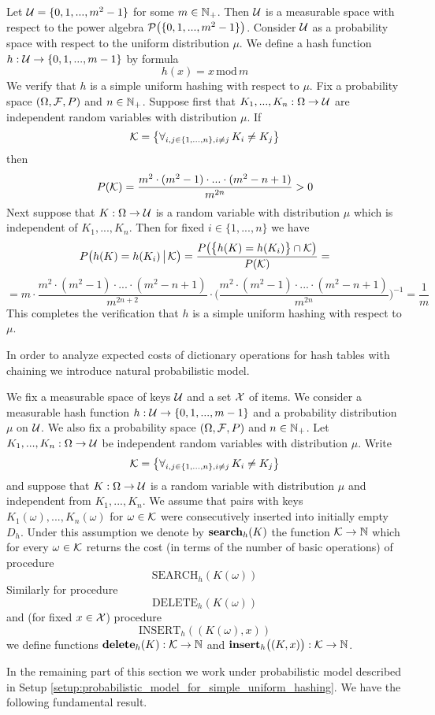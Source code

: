 \begin{example}\label{example:interval_of_integers_with_modulo_hash_function_as_an_example_of_suh}
Let ${\mathcal U} = \{0,1,...,m^2-1\}$ for some $m\in {\mathbb N}_+$. Then ${\mathcal U}$ is a measurable space with respect to the power algebra ${\mathcal P}\big(\{0,1,...,m^2-1\}\big)$. Consider ${\mathcal U}$ as a probability space with respect to the uniform distribution $\mu$. We define a hash function $h:{\mathcal U} \rightarrow \{0,1,...,m-1\}$ by formula
$$h(x) = x\,\mathrm{mod}\,m$$
We verify that $h$ is a simple uniform hashing with respect to $\mu$. Fix a probability space $(\Omega,{\mathcal F},P)$ and $n\in {\mathbb N}_+$. Suppose first that $K_1,...,K_n:\Omega\rightarrow {\mathcal U}$ are independent random variables with distribution $\mu$. If 
$${\mathcal K} =\big\{\forall_{i,j\in \{1,...,n\},i\neq j}\,K_i\neq K_j\big\}$$
then
$$P({\mathcal K}) = \frac{m^2 \cdot (m^2 - 1) \cdot ... \cdot (m^2 - n + 1)}{m^{2n}} > 0$$
Next suppose that $K:\Omega\rightarrow {\mathcal U}$ is a random variable with distribution $\mu$ which is independent of $K_1,...,K_n$. Then for fixed $i\in \{1,...,n\}$ we have 
$$P\big(h(K) = h(K_i)\,\big|\,{\mathcal K}\big) = \frac{P\big(\big\{h(K) = h(K_i) \big\}\cap {\mathcal K}\big)}{P({\mathcal K})} =$$
$$= m\cdot \frac{m^2 \cdot (m^2 - 1)\cdot ... \cdot (m^2 - n + 1)}{ m^{2n+2}} \cdot \bigg(\frac{m^2 \cdot (m^2 - 1) \cdot ... \cdot (m^2 - n + 1)}{m^{2n}}\bigg)^{-1} =  \frac{1}{m}$$
This completes the verification that $h$ is a simple uniform hashing with respect to $\mu$.
\end{example}
\noindent
In order to analyze expected costs of dictionary operations for hash tables with chaining we introduce natural probabilistic model. 

\begin{setup}\label{setup:probabilistic_model_for_simple_uniform_hashing}
We fix a measurable space of keys ${\mathcal U}$ and a set ${\mathcal X}$ of items. We consider a measurable hash function $h:{\mathcal U}\rightarrow \{0,1,...,m-1\}$ and a probability distribution $\mu$ on ${\mathcal U}$. We also fix a probability space $(\Omega,{\mathcal F},P)$ and $n\in {\mathbb N}_+$. Let $K_1,...,K_n:\Omega \rightarrow {\mathcal U}$ be independent random variables with distribution $\mu$. Write
$${\mathcal K} = \big\{\forall_{i,j\in \{1,...,n\},i\neq j}\,K_i\neq K_j\big\}$$
and suppose that $K:\Omega\rightarrow {\mathcal U}$ is a random variable with distribution $\mu$ and independent from $K_1,...,K_n$. We assume that pairs with keys $K_1(\omega),...,K_n(\omega)$ for $\omega \in {\mathcal K}$ were consecutively inserted into initially empty $D_h$. Under this assumption we denote by $\mathbf{search}_h(K)$ the function ${\mathcal K}\rightarrow {\mathbb N}$ which for every $\omega \in {\mathcal K}$ returns the cost (in terms of the number of basic operations) of procedure 
$$\mathrm{SEARCH}_h(K(\omega))$$
Similarly for procedure
$$\mathrm{DELETE}_h(K(\omega))$$ 
and (for fixed $x\in {\mathcal X}$) procedure
$$\mathrm{INSERT}_h\left((K(\omega),x)\right)$$
we define functions $\mathbf{delete}_h(K):{\mathcal K}\rightarrow {\mathbb N}$ and $\mathbf{insert}_h\big((K,x)\big):{\mathcal K}\rightarrow {\mathbb N}$.
\end{setup}
\noindent
In the remaining part of this section we work under probabilistic model described in Setup \ref{setup:probabilistic_model_for_simple_uniform_hashing}. We have the following fundamental result.

